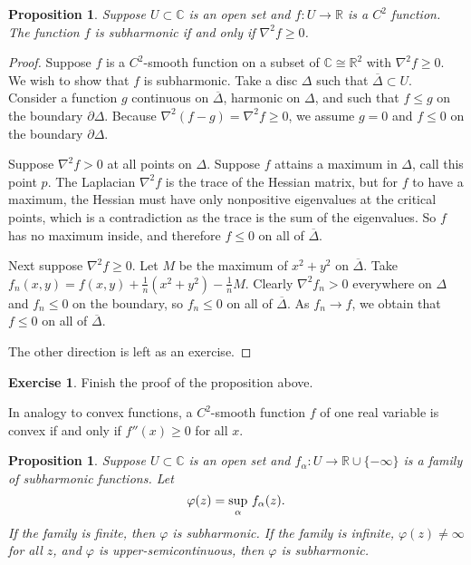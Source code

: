 \documentclass[12pt,openany]{book}
\newcommand{\avoidbreak}{\postdisplaypenalty=100}
\newcommand{\C}{{\mathbb{C}}}
\newcommand{\R}{{\mathbb{R}}}
\theoremstyle{plain}
\newtheorem{prop}[thm]{Proposition}
\theoremstyle{remark}
\theoremstyle{definition}
\newenvironment{exbox}{%
    \def\FrameCommand{\vrule width 1pt \relax\hspace{10pt}}%
    \MakeFramed{\advance\hsize-\width\FrameRestore}%
}{%
    \endMakeFramed
}
\theoremstyle{exercise}
\newtheorem{exercise}{Exercise}[section]
\theoremstyle{example}
\begin{document}
\begin{prop}
Suppose $U \subset \C$ is an open set and $f \colon U \to \R$ is a $C^2$ function.
The function $f$ is subharmonic if and only if
$\nabla^2 f \geq 0$.
\end{prop}

\begin{proof}
Suppose $f$ is a $C^2$-smooth function on a subset of $\C \cong \R^2$
with $\nabla^2 f \geq 0$.  We wish to show that $f$ is subharmonic.
Take a disc $\Delta$ such that $\overline{\Delta} \subset U$.
Consider a function
$g$ continuous on $\overline{\Delta}$,
harmonic on $\Delta$, and such that
$f \leq g$ on the boundary $\partial \Delta$.  Because
$\nabla^2 (f-g) = \nabla^2 f \geq 0$, we assume $g = 0$ and $f \leq 0$
on the boundary $\partial \Delta$.

Suppose $\nabla^2 f > 0$ at all points on $\Delta$.
Suppose $f$ attains a maximum in $\Delta$,
call this point $p$.
The Laplacian $\nabla^2 f$ is the trace of the Hessian matrix, but for $f$ to have a
maximum, the Hessian must have only nonpositive eigenvalues at the critical
points, which is a
contradiction as the trace is the sum of the eigenvalues.  So $f$ has no
maximum inside, and therefore $f \leq 0$ on all of
$\overline{\Delta}$.

Next suppose $\nabla^2 f \geq 0$.
Let $M$ be the maximum of $x^2+y^2$ on $\overline{\Delta}$.
Take $f_n(x,y) = f(x,y) + \frac{1}{n}
( x^2+y^2 ) - \frac{1}{n}M$.  Clearly $\nabla^2 f_n > 0$ everywhere on
$\Delta$ and
$f_n \leq 0$ on the boundary, so $f_n \leq 0$
on all of $\overline{\Delta}$.  As $f_n \to f$, we obtain that
$f \leq 0$ on all of $\overline{\Delta}$.

The other direction is left as an exercise.
\end{proof}

\begin{exbox}
\begin{exercise}
Finish the proof of the proposition above.
\end{exercise}
\end{exbox}

In analogy to convex functions, a $C^2$-smooth function $f$ of one
real variable is convex if and only if $f''(x) \geq 0$ for all $x$.

\begin{prop}
\pagebreak[2]%
Suppose $U \subset \C$ is an open set and $f_\alpha \colon U \to \R \cup \{ -\infty \}$
is a family of subharmonic functions.  Let
\begin{equation*}
\varphi(z) = \sup_\alpha\, f_\alpha(z) .
\avoidbreak
\end{equation*}
If the family is finite, then $\varphi$ is subharmonic.
If the family is infinite, $\varphi(z) \not= \infty$ for
all $z$, and $\varphi$
is upper-semicontinuous, then $\varphi$ is subharmonic.
\end{prop}
\end{document}

